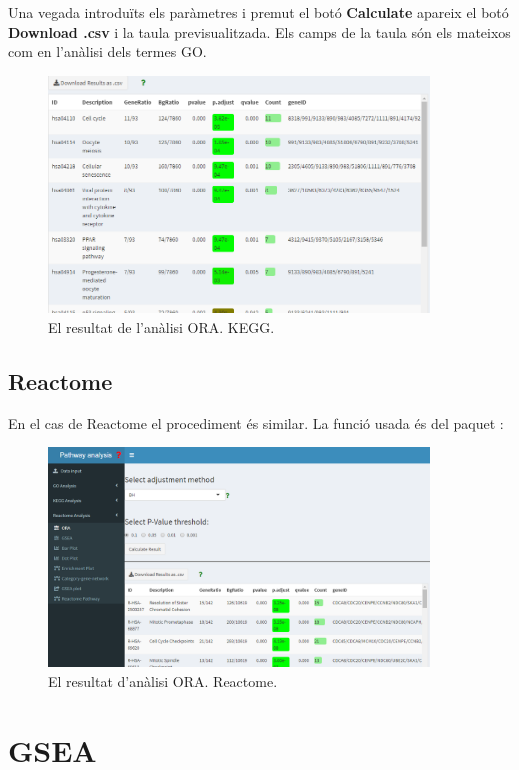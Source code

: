 Una vegada introduïts els paràmetres i premut el botó \textbf{Calculate} apareix el botó \textbf{Download .csv} i la taula previsualitzada. Els camps de la taula són els mateixos com en l'anàlisi dels termes GO.
\begin{figure}[H]
\centering
\includegraphics[width=0.9\textwidth]{figures/App_F9_Items_KEGG_ORA_Table.png} 
\caption{El resultat de l'anàlisi ORA. KEGG.}
\end{figure}

\subsection{Reactome}
En el cas de Reactome el procediment és similar. La funció usada és  del paquet :


\begin{figure}[H]
\centering
\includegraphics[width=0.9\textwidth]{figures/App_F10_Items_Reactome_ORA.png} 
\caption{El resultat d'anàlisi ORA. Reactome.}
\end{figure}

\section{GSEA}

